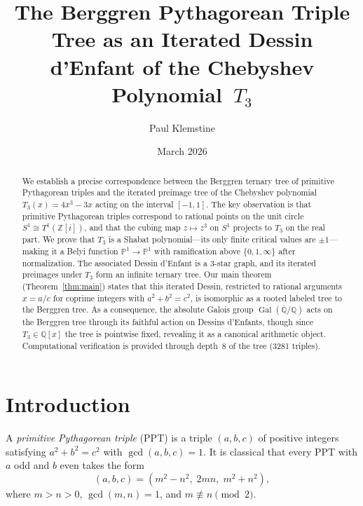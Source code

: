 \documentclass[12pt]{amsart}
\title{The Berggren Pythagorean Triple Tree as an Iterated Dessin d'Enfant
       of the Chebyshev Polynomial~$T_3$}
\author{Paul Klemstine}
\date{March 2026}
\theoremstyle{definition}
\theoremstyle{remark}
\newcommand{\ZZ}{\mathbb{Z}}
\newcommand{\QQ}{\mathbb{Q}}
\newcommand{\PP}{\mathbb{P}}
\newcommand{\Gal}{\operatorname{Gal}}
\renewcommand{\gcd}{\operatorname{gcd}}
\begin{document}
\begin{abstract}
We establish a precise correspondence between the Berggren ternary tree of
primitive Pythagorean triples and the iterated preimage tree of the
Chebyshev polynomial $T_3(x)=4x^3-3x$ acting on the interval $[-1,1]$.
The key observation is that primitive Pythagorean triples correspond to
rational points on the unit circle $S^1 \cong T^1(\ZZ[i])$, and that the
cubing map $z\mapsto z^3$ on $S^1$ projects to $T_3$ on the real part.
We prove that $T_3$ is a Shabat polynomial---its only finite critical
values are $\pm 1$---making it a Belyi function $\PP^1\to\PP^1$ with
ramification above $\{0,1,\infty\}$ after normalization.  The associated
Dessin d'Enfant is a 3-star graph, and its iterated preimages under $T_3$
form an infinite ternary tree.  Our main theorem (Theorem~\ref{thm:main})
states that this iterated Dessin, restricted to rational arguments
$x = a/c$ for coprime integers with $a^2 + b^2 = c^2$, is isomorphic as a
rooted labeled tree to the Berggren tree.  As a consequence, the absolute
Galois group $\Gal(\overline{\QQ}/\QQ)$ acts on the Berggren tree through
its faithful action on Dessins d'Enfants, though since $T_3\in\QQ[x]$ the
tree is pointwise fixed, revealing it as a canonical arithmetic object.
Computational verification is provided through depth~8 of the tree
(3281 triples).
\end{abstract}

\maketitle

\tableofcontents

\section{Introduction}\label{sec:intro}

A \emph{primitive Pythagorean triple} (PPT) is a triple $(a,b,c)$ of
positive integers satisfying $a^2+b^2=c^2$ with $\gcd(a,b,c)=1$.
It is classical that every PPT with $a$ odd and $b$ even takes the form
\begin{equation}\label{eq:mn-param}
  (a,b,c) = (m^2-n^2,\; 2mn,\; m^2+n^2),
\end{equation}
where $m>n>0$, $\gcd(m,n)=1$, and $m\not\equiv n\pmod{2}$.
\end{document}
